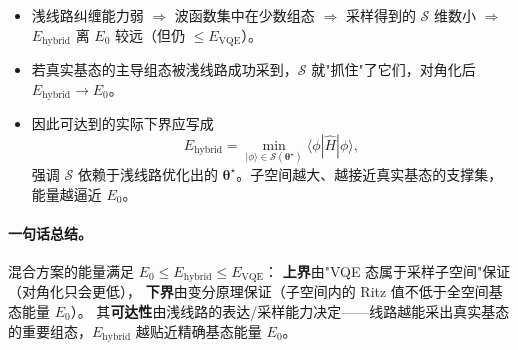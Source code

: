 \documentclass[11pt,a4paper]{article}
\begin{document}
\begin{itemize}
  \item 浅线路纠缠能力弱 $\Rightarrow$ 波函数集中在少数组态 $\Rightarrow$ 采样得到的 $\mathcal{S}$ 维数小 $\Rightarrow$ $E_{\text{hybrid}}$ 离 $E_0$ 较远（但仍 $\leq E_{\text{VQE}}$）。
  \item 若真实基态的主导组态被浅线路成功采到，$\mathcal{S}$ 就"抓住"了它们，对角化后 $E_{\text{hybrid}} \to E_0$。
  \item 因此可达到的实际下界应写成
  $$E_{\text{hybrid}} = \min_{|\phi\rangle \in \mathcal{S}(\boldsymbol\theta^\star)} \langle\phi|\hat{H}|\phi\rangle,$$
  强调 $\mathcal{S}$ 依赖于浅线路优化出的 $\boldsymbol\theta^\star$。子空间越大、越接近真实基态的支撑集，能量越逼近 $E_0$。
\end{itemize}

\paragraph{一句话总结。}
混合方案的能量满足 $E_0 \leq E_{\text{hybrid}} \leq E_{\text{VQE}}$：
\textbf{上界}由"VQE 态属于采样子空间"保证（对角化只会更低），
\textbf{下界}由变分原理保证（子空间内的 Ritz 值不低于全空间基态能量 $E_0$）。
其\textbf{可达性}由浅线路的表达/采样能力决定——线路越能采出真实基态的重要组态，$E_{\text{hybrid}}$ 越贴近精确基态能量 $E_0$。
\end{document}

